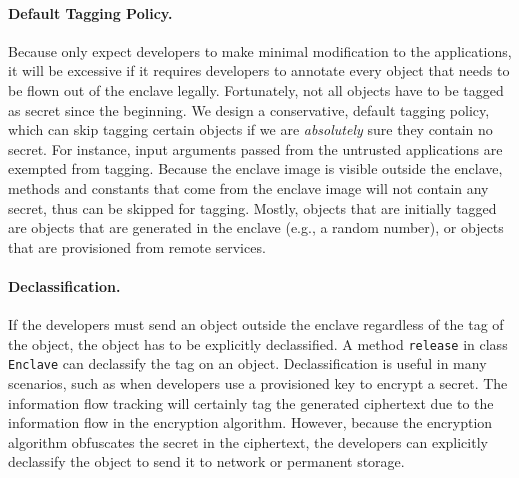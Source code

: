 \paragraph{Default Tagging Policy.}
Because \sysname{} only expect developers to make minimal modification
to the applications,
it will be excessive if it requires developers to
annotate every object that needs to be flown out of the enclave legally.
Fortunately, not all objects have to be tagged as secret since the beginning.
We design a conservative, default tagging policy,
which can skip tagging certain objects
if we are {\em absolutely} sure they contain no secret.
For instance, input arguments passed from the untrusted applications are
exempted from tagging.
Because the enclave image is visible outside the enclave,
methods and constants that come from the enclave image
will not contain any secret,
thus can be skipped for tagging.
Mostly, objects that are initially tagged are
objects that are generated in the enclave (e.g., a random number),
or objects that are provisioned from remote services.

\paragraph{Declassification.}
If the developers must send an object outside the enclave
regardless of the tag of the object,
the object has to be explicitly declassified.
A method {\tt release} in class {\tt Enclave} can declassify the tag
on an object.
Declassification is useful in many scenarios,
such as when developers use a provisioned key to encrypt a secret.
The information flow tracking will certainly tag the generated ciphertext
due to the information flow in the encryption algorithm.
However, because the encryption algorithm obfuscates the secret in the ciphertext,
the developers can explicitly declassify the object
to send it to network or permanent storage.







